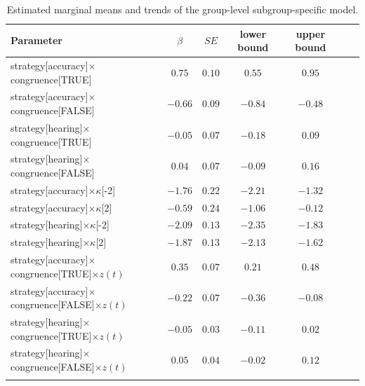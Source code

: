 \documentclass[pdflatex,sn-mathphys]{sn-jnl}
\begin{document}
\begin{table}[h]
\begin{center}
\begin{minipage}{\textwidth}
\caption{Estimated marginal means and trends of the group-level subgroup-specific model.}\label{tab5}
\begin{tabular*}{\textwidth}{@{\extracolsep{\fill}}lcccccc@{\extracolsep{\fill}}}
\toprule%
Parameter & $\beta$ & $SE$ & lower bound & upper bound \\
\midrule
strategy[accuracy]$\times$congruence[TRUE] & $0.75$ & $0.10$ & $0.55$ & $0.95$ \\
strategy[accuracy]$\times$congruence[FALSE] & $-0.66$ & $0.09$ & $-0.84$ & $-0.48$ \\
strategy[hearing]$\times$congruence[TRUE] & $-0.05$ & $0.07$ & $-0.18$ & $0.09$ \\
strategy[hearing]$\times$congruence[FALSE] & $0.04$ & $0.07$ & $-0.09$ & $0.16$ \\
strategy[accuracy]$\times\kappa$[-2] & $-1.76$ & $0.22$ & $-2.21$ & $-1.32$ \\
strategy[accuracy]$\times\kappa$[2] & $-0.59$ & $0.24$ & $-1.06$ & $-0.12$ \\
strategy[hearing]$\times\kappa$[-2] & $-2.09$ & $0.13$ & $-2.35$ & $-1.83$ \\
strategy[hearing]$\times\kappa$[2] & $-1.87$ & $0.13$ & $-2.13$ & $-1.62$ \\
strategy[accuracy]$\times$congruence[TRUE]$\times z(t)$ & $0.35$ & $0.07$ & $0.21$ & $0.48$ \\
strategy[accuracy]$\times$congruence[FALSE]$\times z(t)$ & $-0.22$ & $0.07$ & $-0.36$ & $-0.08$ \\
strategy[hearing]$\times$congruence[TRUE]$\times z(t)$ & $-0.05$ & $0.03$ & $-0.11$ & $0.02$ \\
strategy[hearing]$\times$congruence[FALSE]$\times z(t)$ & $0.05$ & $0.04$ & $-0.02$ & $0.12$ \\
\botrule
\end{tabular*}
\end{minipage}
\end{center}
\end{table}
\end{document}

